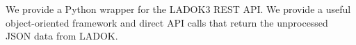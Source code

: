 We provide a Python wrapper for the LADOK3 REST API\@.
We provide a useful object-oriented framework and direct API calls that return 
the unprocessed JSON data from LADOK.
